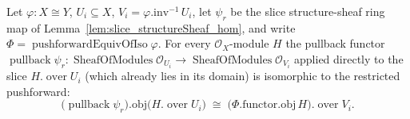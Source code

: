 \begin{lemma}\leanok
  \label{lem:pushforward_slice_pullback_iso}
  Let \(\varphi : X \cong Y\), \(U_i \subseteq X\), \(V_i = \varphi.\mathrm{inv}^{-1}\,U_i\), let
  \(\psi_r\) be the slice structure-sheaf ring map of Lemma~\ref{lem:slice_structureSheaf_hom}, and write
  \(\Phi = \operatorname{pushforwardEquivOfIso}\varphi\). For every \(\mathcal{O}_X\)-module \(H\) the
  pullback functor \(\operatorname{pullback}\psi_r : \operatorname{SheafOfModules}\mathcal{O}_{U_i} \to
  \operatorname{SheafOfModules}\mathcal{O}_{V_i}\) applied directly to the slice
  \(H.\operatorname{over} U_i\) (which already lies in its domain) is isomorphic to the restricted
  pushforward:
  \[
    \bigl(\operatorname{pullback}\psi_r\bigr).\mathrm{obj}\bigl(H.\operatorname{over} U_i\bigr)
      \;\cong\;
    \bigl(\Phi.\mathrm{functor}.\mathrm{obj}\, H\bigr).\operatorname{over} V_i .
  \]
\end{lemma}

